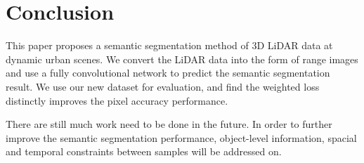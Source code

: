 	
	\section{Conclusion}
	This paper proposes a semantic segmentation method of 3D LiDAR data at dynamic urban scenes. We convert the LiDAR data into the form of range images and use a fully convolutional network to predict the semantic segmentation result. We use our new dataset for evaluation, and find the weighted loss distinctly improves the pixel accuracy performance.
	
	There are still much work need to be done in the future. In order to further improve the semantic segmentation performance, object-level information, spacial and temporal constraints between samples will be addressed on.
	
	
		


		
		

